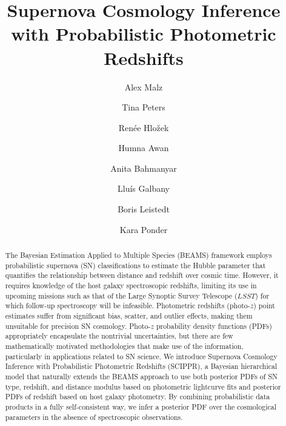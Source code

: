 \documentclass[12pt, twocolumn]{emulateapj}
\begin{document}
\title{Supernova Cosmology Inference with Probabilistic Photometric Redshifts}

\author{Alex Malz}
\author{Tina Peters}
\author{Ren\'ee Hlo\v{z}ek}
\author{Humna Awan}
\author{Anita Bahmanyar}
\author{Llu\'{i}s Galbany}
\author{Boris Leistedt}
\author{Kara Ponder}

\begin{abstract}

The Bayesian Estimation Applied to Multiple Species (BEAMS) framework employs probabilistic supernova (SN) classifications to estimate the Hubble parameter that quantifies the relationship between distance and redshift over cosmic time.
However, it requires knowledge of the host galaxy spectroscopic redshifts, limiting its use in upcoming missions such as that of the Large Synoptic Survey Telescope ($LSST$) for which follow-up spectroscopy will be infeasible.
Photometric redshifts (photo-$z$) point estimates suffer from significant bias, scatter, and outlier effects, making them unsuitable for precision SN cosmology.
Photo-$z$ probability density functions (PDFs) appropriately encapsulate the nontrivial uncertainties, but there are few mathematically motivated methodologies that make use of the information, particularly in applications related to SN science.
We introduce Supernova Cosmology Inference with Probabilistic Photometric Redshifts (SCIPPR), a Bayesian hierarchical model that naturally extends the BEAMS approach to use both posterior PDFs of SN type, redshift, and distance modulus based on photometric lightcurve fits and posterior PDFs of redshift based on host galaxy photometry.
By combining probabilistic data products in a fully self-consistent way, we infer a posterior PDF over the cosmological parameters in the absence of spectroscopic observations.

\end{abstract}
\end{document}
